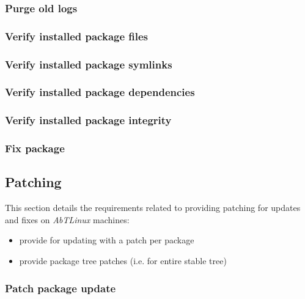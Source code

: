 \newpage
\subsubsection{Purge old logs}


\newpage
\subsubsection{Verify installed package files}


\newpage
\subsubsection{Verify installed package symlinks}


\newpage
\subsubsection{Verify installed package dependencies}


\newpage
\subsubsection{Verify installed package integrity}


\newpage
\subsubsection{Fix package}




\newpage
\subsection{Patching}
This section details the requirements related to providing patching for
updates and fixes on \emph{AbTLinux} machines:

\begin{itemize}
  \item provide for updating with a patch per package
  \item provide package tree patches (i.e. for entire stable tree)
\end{itemize}

%
%
\subsubsection{Patch package update}


